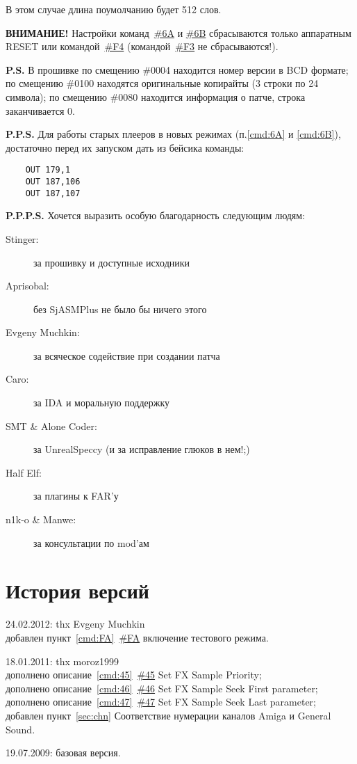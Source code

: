\documentclass[a4paper,11pt]{article}
\begin{document}
		В этом случае длина поумолчанию будет 512 слов.

\textbf{ВНИМАНИЕ!} Настройки команд~\hyperref[cmd:6A]{\#6A} и \hyperref[cmd:6B]{\#6B}
сбрасываются только аппаратным RESET или командой~\hyperref[cmd:F4]{\#F4}
(командой~\hyperref[cmd:F3]{\#F3} не сбрасываются!).

\textbf{P.S.} В прошивке по смещению \#0004 находится номер версии в BCD формате;
по смещению \#0100 находятся оригинальные копирайты (3 строки по 24 символа);
по смещению \#0080 находится информация о патче, строка заканчивается 0.

\textbf{P.P.S.} Для работы старых плееров в новых режимах (п.\ref{cmd:6A} и \ref{cmd:6B}),
достаточно перед их запуском дать из бейсика команды:
\begin{verbatim}
    OUT 179,1
    OUT 187,106
    OUT 187,107
\end{verbatim}

\textbf{P.P.P.S.} Хочется выразить особую благодарность следующим людям:
\begin{description}
\item[Stinger:] за прошивку и доступные исходники
\item[Aprisobal:] без SjASMPlus не было бы ничего этого
\item[Evgeny Muchkin:] за всяческое содействие при создании патча
\item[Caro:] за IDA и моральную поддержку
\item[SMT \& Alone Coder:] за UnrealSpeccy (и за исправление глюков в нем!;)
\item[Half Elf:] за плагины к FAR'у
\item[n1k-o \& Manwe:] за консультации по mod'ам
\end{description}

\section{История версий}

24.02.2012: thx Evgeny Muchkin\\
добавлен  пункт~\ref{cmd:FA}~\hyperref[cmd:FA]{\#FA} включение тестового режима.

18.01.2011: thx  moroz1999\\
дополнено описание~\ref{cmd:45}~\hyperref[cmd:45]{\#45} Set FX Sample Priority;\\
дополнено описание~\ref{cmd:46}~\hyperref[cmd:46]{\#46} Set FX Sample Seek First parameter;\\
дополнено описание~\ref{cmd:47}~\hyperref[cmd:47]{\#47} Set FX Sample Seek Last parameter;\\
добавлен пункт~\ref{sec:chn} Соответствие нумерации каналов Amiga и General Sound.

19.07.2009: базовая версия.
\end{document}
